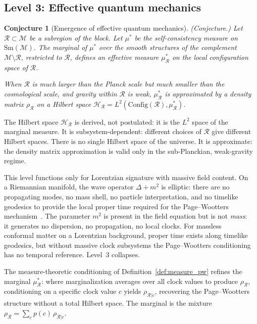 \documentclass[12pt,a4paper]{article}
\newtheorem{conjecture}{Conjecture}
\theoremstyle{definition}
\theoremstyle{remark}
\begin{document}
\subsection{Level 3: Effective quantum mechanics}
\label{sec:level3}

\begin{conjecture}[Emergence of effective quantum mechanics]
\emph{(Conjecture.)}
\label{conj:qm}
Let $\mathcal{R} \subset \mathcal{M}$ be a subregion of the block. Let
$\mu^*$ be the self-consistency measure on $\mathrm{Sm}(\mathcal{M})$.
The marginal of $\mu^*$ over the smooth structures of the complement
$\mathcal{M} \setminus \mathcal{R}$, restricted to $\mathcal{R}$, defines
an effective measure $\mu^*_\mathcal{R}$ on the local configuration space
of $\mathcal{R}$.

When $\mathcal{R}$ is much larger than the Planck scale but much smaller
than the cosmological scale, and gravity within $\mathcal{R}$ is weak,
$\mu^*_\mathcal{R}$ is approximated by a density matrix
$\rho_\mathcal{R}$ on a Hilbert space $\mathcal{H}_\mathcal{R} =
L^2(\mathrm{Config}(\mathcal{R}), \mu^*_\mathcal{R})$.
\end{conjecture}

The Hilbert space $\mathcal{H}_\mathcal{R}$ is derived, not
postulated: it is the $L^2$ space of the marginal measure.
It is subsystem-dependent: different choices of $\mathcal{R}$ give
different Hilbert spaces. There is no single Hilbert space of the
universe. It is approximate: the density matrix approximation is valid
only in the sub-Planckian, weak-gravity regime.

This level functions only for Lorentzian signature with massive field
content. On a Riemannian manifold, the wave operator $\Delta + m^2$ is
elliptic: there are no propagating modes, no mass shell, no particle
interpretation, and no timelike geodesics to provide the local proper
time required for the Page--Wootters mechanism~\cite{page_wootters}. The
parameter $m^2$ is present in the field equation but is not
\emph{mass}: it generates no dispersion, no propagation, no local
clocks. For massless conformal matter on a Lorentzian background, proper
time exists along timelike geodesics, but without massive clock
subsystems the Page--Wootters conditioning has no temporal reference.
Level~3 collapses.

The measure-theoretic conditioning of Definition~\ref{def:measure_pw}
refines the marginal $\mu^*_\mathcal{R}$: where marginalization averages
over all clock values to produce $\rho_\mathcal{R}$, conditioning on a
specific clock value $c$ yields $\rho_{\mathcal{R}|c}$, recovering the
Page--Wootters structure without a total Hilbert space. The marginal is the
mixture $\rho_\mathcal{R} = \sum_c p(c)\,\rho_{\mathcal{R}|c}$.
\end{document}
